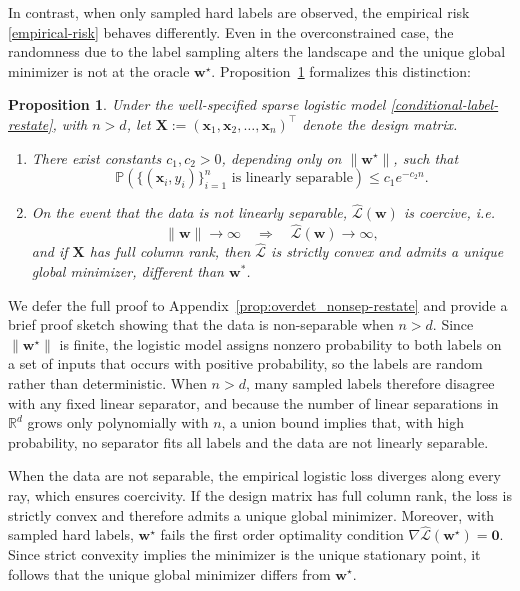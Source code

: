 \documentclass{article}
\theoremstyle{plain}
\newtheorem{proposition}[theorem]{Proposition}
\theoremstyle{definition}
\theoremstyle{remark}
\begin{document}
In contrast, when only sampled hard labels are observed, the empirical risk \eqref{empirical-risk} behaves differently. Even in the overconstrained case, the randomness due to the label sampling alters the landscape and the unique global minimizer is not at the oracle $\mathbf{w}^{\star}$. Proposition~\ref{prop:overdet_nonsep} formalizes this distinction:

\begin{proposition}
\label{prop:overdet_nonsep}
Under the well-specified sparse logistic model \eqref{conditional-label-restate}, with $n>d$, let
$\mathbf{X}:=(\mathbf{x}_{1},\mathbf{x}_{2},\ldots,\mathbf{x}_{n})^\top$ denote the design matrix.
\begin{enumerate}
[leftmargin=*,itemsep=0pt,topsep=1pt]
\item There exist constants $c_1,c_2>0$, depending only on $\|\mathbf w^\star\|$, such that
\[
\mathbb{P}\!\left(\{(\mathbf{x}_i,y_i)\}_{i=1}^n \text{ is linearly separable}\right)
\le c_1 e^{-c_2 n}.
\]

\item On the event that the data is not linearly separable,
$\widehat{\mathcal L}(\mathbf w)$ is coercive, i.e.
\[
\|\mathbf w\|\to\infty \quad \Longrightarrow \quad \widehat{\mathcal L}(\mathbf w)\to\infty,
\]
and if $\mathbf X$ has full column rank, then $\widehat{\mathcal L}$ is strictly convex and
admits a unique global minimizer, different than $\mathbf{w}^{*}$.
\end{enumerate}
\end{proposition}


We defer the full proof to Appendix~\ref{prop:overdet_nonsep-restate} and provide a brief proof sketch showing that the data is non-separable when $n>d$. Since $\|\mathbf{w}^\star\|$ is finite, the logistic model assigns nonzero
probability to both labels on a set of inputs that occurs with positive probability, so the labels are random rather than deterministic. When $n>d$, many sampled labels therefore disagree with any fixed linear separator, and because the number of linear separations in $\mathbb{R}^d$ grows only polynomially with $n$, a union bound implies that, with high probability, no separator fits all labels and the data are not linearly separable.


When the data are not separable, the empirical logistic loss diverges along every ray,
which ensures coercivity. If the design matrix has full column rank, the loss is
strictly convex and therefore admits a unique global minimizer. Moreover, with sampled hard labels, $\mathbf{w}^{\star}$ fails the first order optimality condition $\nabla \widehat{\mathcal L}(\mathbf w^{\star}) =\mathbf{0}$. Since strict convexity implies the minimizer is the unique stationary point, it follows that the unique global minimizer differs from $\mathbf{w}^{\star}$.  
\end{document}
